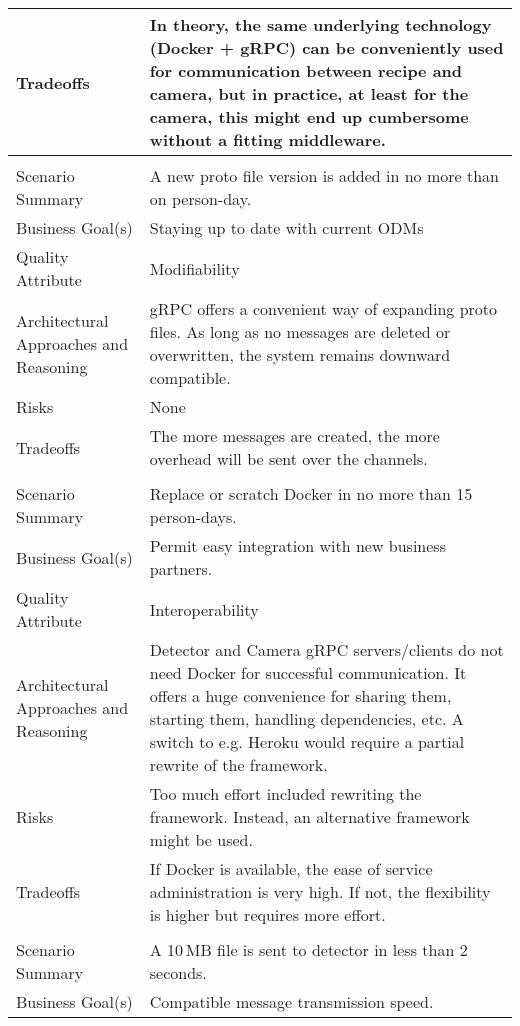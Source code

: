 {\begin{longtable}{| P{0.2\textwidth} | P{0.74\textwidth} |}
Tradeoffs & In theory, the same underlying technology (Docker + gRPC) can be conveniently used for communication between recipe and camera, but in practice, at least for the camera, this might end up cumbersome without a fitting middleware. \\ \hline
{}
 \\ \hline
Scenario Summary & A new proto file version is added in no more than on person-day.\\ \hline
Business Goal(s) & Staying up to date with current ODMs\\ \hline
Quality Attribute & Modifiability\\ \hline
Architectural Approaches and Reasoning & gRPC offers a convenient way of expanding proto files. As long as no messages are deleted or overwritten, the system remains downward compatible.\\ \hline
Risks &  None\\ \hline
Tradeoffs &  The more messages are created, the more overhead will be sent over the channels.\\ \hline
{}
 \\ \hline
Scenario Summary & Replace or scratch Docker in no more than 15 person-days.\\ \hline
Business Goal(s) & Permit easy integration with new business partners. \\ \hline
Quality Attribute & Interoperability\\ \hline
Architectural Approaches and Reasoning & Detector and Camera gRPC servers/clients do not need Docker for successful communication. It offers a huge convenience for sharing them, starting them, handling dependencies, etc. A switch to e.g. Heroku would require a partial rewrite of the framework.\\ \hline
Risks &  Too much effort included rewriting the framework. Instead, an alternative framework might be used.\\ \hline
Tradeoffs & If Docker is available, the ease of service administration is very high. If not, the flexibility is higher but requires more effort.\\ \hline
{}
 \\ \hline
Scenario Summary & A 10\,MB file is sent to detector in less than 2 seconds. \\ \hline
Business Goal(s) & Compatible message transmission speed.\\ \hline

\end{longtable}}
